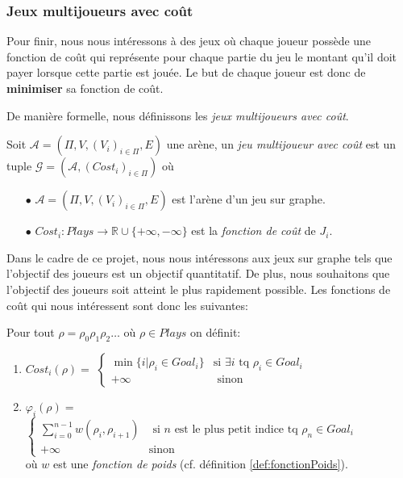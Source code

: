 

\subsubsection{Jeux multijoueurs avec coût}
Pour finir, nous nous intéressons à des jeux où chaque joueur possède une fonction de coût qui représente pour chaque partie du jeu le montant qu'il doit payer lorsque cette partie est jouée. Le but de chaque joueur est donc de \textbf{minimiser} sa fonction de coût.

De manière formelle, nous définissons les \emph{jeux multijoueurs avec coût}.

\begin{defi}
	Soit $\mathcal{A} = (\Pi, V, (V_{i})_{i \in \Pi},E)$ une arène,
	un \textit{jeu multijoueur avec coût} est un tuple $\mathcal{G} = (\mathcal{A},(Cost_{i})_{i \in \Pi})$ où
	\begin{enumerate}
		\item[$\bullet$] $\mathcal{A} = (\Pi ,V ,(V_{i})_{i \in \Pi} ,E )$ est l'arène d'un jeu sur graphe.
		\item[$\bullet$] $Cost_{i}: Plays \rightarrow \mathbb{R} \cup \{ +\infty , -\infty \} $ est la \textit{fonction de coût} de $J_{i}$. 
	\end{enumerate}
\end{defi}




  Dans le cadre de ce projet, nous nous intéressons aux jeux sur graphe tels que l'objectif des joueurs est un objectif quantitatif. De plus, nous souhaitons que l'objectif des joueurs soit atteint le plus rapidement possible. Les fonctions de coût qui nous intéressent sont donc les suivantes: \\
\begin{exemple}
		\label{ex:fonctionsCout}
	Pour tout  $\rho = \rho _{0} \rho _{1} \rho _{2} \ldots $ où $\rho \in Plays$ on définit:
	\begin{enumerate}
	\item $Cost_{i}(\rho) = $ $\begin{cases} 
									\min \{ i | \rho _{i} \in Goal_{i} \} & \text{si } \exists i \text{ tq } \rho _{i} \in Goal_{i} \\
									
									+\infty & \text{ sinon}
									\end{cases}$
	\item $\varphi _{i}(\rho) = $ $\begin{cases}
									\sum_{i = 0}^{n-1} w(\rho_{i},\rho_{i+1}) & \text{ si } n \text{ est le plus petit indice tq } \rho_{n}\in Goal_{i}\\
									+\infty & \text{sinon}
									\end{cases}$ \\
									où $w$ est une \textit{fonction de poids} (cf. définition \ref{def:fonctionPoids}).
	\end{enumerate}
\end{exemple}

